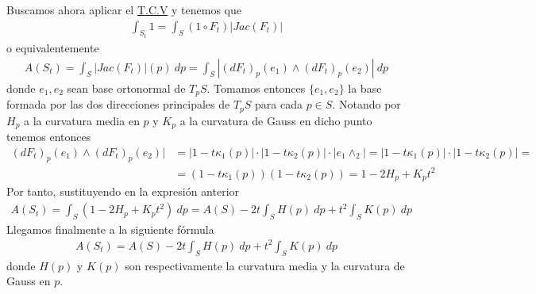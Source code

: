 \begin{ejemplo}
\begin{enumerate}
        Buscamos ahora aplicar el \hyperref[teo:cambio_variable_integral_sup]{T.C.V} y tenemos que 
        \begin{gather*}
            \int_{S_t} 1 = \int_S(1 \circ F_t)|Jac(F_t)|
        \end{gather*}
        o equivalentemente
        \begin{gather*}
            A(S_t) = \int_S |Jac(F_t)|(p)\ dp = \int_S|(dF_t)_p(e_1) \wedge (dF_t)_p(e_2)|\ dp
        \end{gather*}
        donde $e_1, e_2$ sean base ortonormal de $T_pS$. Tomamos entonces $\{e_1, e_2\}$ la base formada por las dos direcciones principales de $T_pS$ para cada $p\in S$. Notando por $H_p$ a la curvatura media en $p$ y $K_p$ a la curvatura de Gauss en dicho punto tenemos entonces
        \begin{align*}
            (dF_t)_p(e_1) \wedge (dF_t)_p(e_2)| &=
            |1-t\kappa_1(p)|\cdot|1-t\kappa_2(p)|\cdot|e_1\wedge_2| =
            |1-t\kappa_1(p)|\cdot|1-t\kappa_2(p)| =\\
            &=
            (1-t\kappa_1(p)) (1-t\kappa_2(p)) = 
            1 - 2H_p + K_pt^2
        \end{align*}
        Por tanto, sustituyendo en la expresión anterior
        \begin{gather*}
            A(S_t) = 
            \int_S (1 - 2H_p + K_pt^2)\ dp = A(S) -2t\int_S H(p)\ dp + t^2 \int_S K(p)\ dp
        \end{gather*}
        Llegamos finalmente a la siguiente fórmula
        \begin{gather*}
            \boxed{A(S_t) = A(S) -2t\int_S H(p)\ dp + t^2 \int_S K(p)\ dp}
        \end{gather*}
        donde $H(p)$ y $K(p)$ son respectivamente la curvatura media y la curvatura de Gauss en $p$.
    \end{enumerate}
\end{ejemplo}

